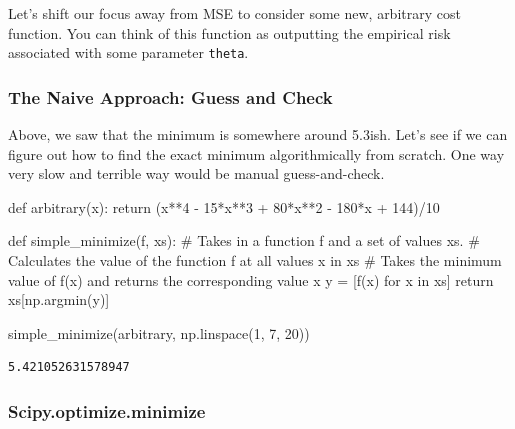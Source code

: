 \documentclass[
  letterpaper,
  DIV=11,
  numbers=noendperiod]{scrreprt}
\newenvironment{Shaded}{\begin{snugshade}}{\end{snugshade}}
\newcommand{\CommentTok}[1]{\textcolor[rgb]{0.37,0.37,0.37}{#1}}
\newcommand{\ControlFlowTok}[1]{\textcolor[rgb]{0.00,0.23,0.31}{#1}}
\newcommand{\DecValTok}[1]{\textcolor[rgb]{0.68,0.00,0.00}{#1}}
\newcommand{\KeywordTok}[1]{\textcolor[rgb]{0.00,0.23,0.31}{#1}}
\newcommand{\NormalTok}[1]{\textcolor[rgb]{0.00,0.23,0.31}{#1}}
\newcommand{\OperatorTok}[1]{\textcolor[rgb]{0.37,0.37,0.37}{#1}}
\begin{document}
Let's shift our focus away from MSE to consider some new, arbitrary cost
function. You can think of this function as outputting the empirical
risk associated with some parameter \texttt{theta}.

\hypertarget{the-naive-approach-guess-and-check}{%
\subsubsection{The Naive Approach: Guess and
Check}\label{the-naive-approach-guess-and-check}}

Above, we saw that the minimum is somewhere around 5.3ish. Let's see if
we can figure out how to find the exact minimum algorithmically from
scratch. One way very slow and terrible way would be manual
guess-and-check.

\begin{Shaded}
\begin{Highlighting}[]
\KeywordTok{def}\NormalTok{ arbitrary(x):}
    \ControlFlowTok{return}\NormalTok{ (x}\OperatorTok{**}\DecValTok{4} \OperatorTok{{-}} \DecValTok{15}\OperatorTok{*}\NormalTok{x}\OperatorTok{**}\DecValTok{3} \OperatorTok{+} \DecValTok{80}\OperatorTok{*}\NormalTok{x}\OperatorTok{**}\DecValTok{2} \OperatorTok{{-}} \DecValTok{180}\OperatorTok{*}\NormalTok{x }\OperatorTok{+} \DecValTok{144}\NormalTok{)}\OperatorTok{/}\DecValTok{10}

\KeywordTok{def}\NormalTok{ simple\_minimize(f, xs):}
    \CommentTok{\# Takes in a function f and a set of values xs. }
    \CommentTok{\# Calculates the value of the function f at all values x in xs}
    \CommentTok{\# Takes the minimum value of f(x) and returns the corresponding value x }
\NormalTok{    y }\OperatorTok{=}\NormalTok{ [f(x) }\ControlFlowTok{for}\NormalTok{ x }\KeywordTok{in}\NormalTok{ xs]  }
    \ControlFlowTok{return}\NormalTok{ xs[np.argmin(y)]}

\NormalTok{simple\_minimize(arbitrary, np.linspace(}\DecValTok{1}\NormalTok{, }\DecValTok{7}\NormalTok{, }\DecValTok{20}\NormalTok{))}
\end{Highlighting}
\end{Shaded}

\begin{verbatim}
5.421052631578947
\end{verbatim}

\hypertarget{scipy.optimize.minimize}{%
\subsubsection{Scipy.optimize.minimize}\label{scipy.optimize.minimize}}
\end{document}
